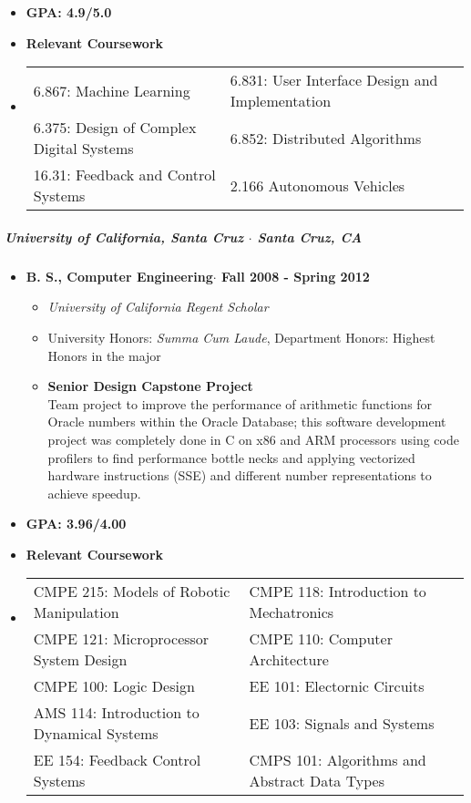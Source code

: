 \documentclass[10pt,letterpaper]{article}
\begin{document}
\begin{itemize}
    \item {\bf GPA:  4.9/5.0 }
	\item {\bf Relevant Coursework}
    \item
    \begin{tabularx}{\textwidth}{l l}
      6.867: Machine Learning 
      & \hfill 6.831: User Interface Design and Implementation\\
      6.375: Design of Complex Digital Systems
      & \hfill 6.852: Distributed Algorithms\\
      16.31: Feedback and Control Systems
      & \hfill 2.166 Autonomous Vehicles\\
     \end{tabularx}
\end{itemize}


\subparagraph{University of California, Santa Cruz $\cdot$ Santa Cruz, CA }
\begin{itemize}
    \item {\bf B. S., Computer Engineering$\cdot$ Fall 2008 - Spring 2012}
    \begin{itemize}
		\item {\em University of California Regent Scholar} 
		\item University Honors: {\em Summa Cum Laude}, Department Honors: Highest Honors in the major

        \item {\bf Senior Design Capstone Project}\\
        Team project to improve the performance of arithmetic functions for Oracle numbers within the Oracle Database; this software development project was completely done in C on x86 and ARM processors using code profilers to find performance bottle necks and applying vectorized hardware instructions (SSE) and different number representations to achieve speedup. 
    \end{itemize}
\end{itemize}

\begin{itemize}
    \item {\bf GPA: 3.96/4.00 }
    \item {\bf Relevant Coursework}
    \item
    \begin{tabularx}{\textwidth}{l l}
        CMPE 215: Models of Robotic Manipulation 
        & \hfill CMPE 118: Introduction to Mechatronics \\
        CMPE 121: Microprocessor System Design 
        & \hfill CMPE 110: Computer Architecture \\
        CMPE 100: Logic Design 
        & \hfill EE 101: Electornic Circuits \\
         AMS 114: Introduction to Dynamical Systems 
        & \hfill EE 103: Signals and Systems \\
        EE 154: Feedback Control Systems 
        & \hfill CMPS 101: Algorithms and Abstract Data Types\\
    \end{tabularx}
\end{itemize}
\end{document}
